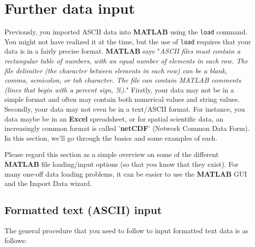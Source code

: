 \documentclass{tufte-book} %
\begin{document}

\newpage


\section{Further data input}

Previously, you imported ASCII data into \textbf{MATLAB} using the \texttt{load} command. You might not have realized it at the time, but the use of \texttt{load} requires that your data is in a fairly precise format. \textbf{MATLAB} says "\textit{ASCII files must contain a rectangular table of numbers, with an equal number of elements in each row. The file delimiter (the character between elements in each row) can be a blank, comma, semicolon, or tab character. The file can contain MATLAB comments (lines that begin with a percent sign, \%).}" Firstly, your data may not be in a simple format and often may contain both numerical values and string values. Secondly, your data may not even be in a text/ASCII format. For instance, you data maybe be in an \textbf{Excel} spreadsheet, or for spatial scientific data, an increasingly common format is called '\textbf{netCDF}' (Network Common Data Form). In this section, we'll go through the basics and some examples of each.

Please regard this section as a simple overview on some of the different \textbf{MATLAB} file loading/input options (so that you know that they exist). For many one-off data loading problems, it can be easier to use the \textbf{MATLAB} GUI and the \textsf{Import Data} wizard. 


\subsection{Formatted text (ASCII) input}

The general procedure that you need to follow to input formatted text data is as follows:
\end{document}
